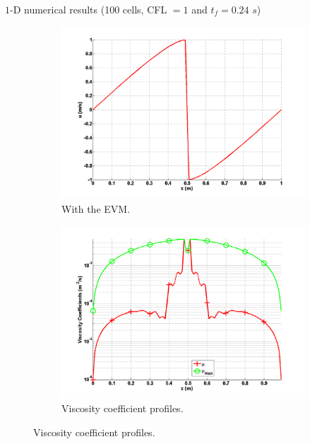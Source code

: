 \documentclass[xcolor=dvipsnames,10pt]{beamer}
\begin{document}
\begin{frame}{$1$-D numerical results (100 cells, CFL $=1$ and $t_f=0.24$ $s$)}
\begin{figure}[H]
        \begin{subfigure}[b]{0.37\textwidth}
                \centering
                \includegraphics[width=\textwidth]{../figures/1D_sol_ev.png}
                \caption{With the EVM.}
        \end{subfigure}
        \begin{subfigure}[b]{0.37\textwidth}
                \centering
                \includegraphics[width=\textwidth]{../figures/1D_visc.png}
                \caption{Viscosity coefficient profiles.}
        \end{subfigure}
\end{figure}
\end{frame}
\end{document}
